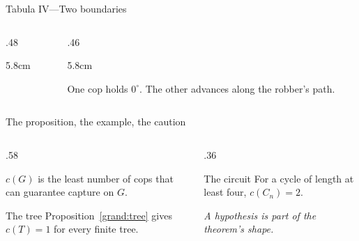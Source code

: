 \documentclass[aspectratio=169,11pt]{beamer}
\begin{document}
\begin{frame}{Tabula IV\enspace—\enspace Two boundaries}
  \begin{columns}[c,onlytextwidth]
    \begin{column}{.48\textwidth}
      \begin{overlayarea}{\linewidth}{5.8cm}
        \centering
      \end{overlayarea}
    \end{column}
    \begin{column}{.46\textwidth}
      \begin{overlayarea}{\linewidth}{5.8cm}
        \small\raggedright
        One cop holds $0^\circ$. The other advances along the robber's path.
        \par\smallskip
        \smallskip
      \end{overlayarea}
    \end{column}
  \end{columns}
\end{frame}

\begin{frame}{The proposition, the example, the caution}
  \begin{columns}[T,onlytextwidth]
    \begin{column}{.58\textwidth}
      \begin{definition}
        $c(G)$ is the least number of cops that can guarantee capture on $G$.
      \end{definition}
      \begin{exampleblock}{The tree}
        Proposition~\ref{grand:tree} gives $c(T)=1$ for every finite tree.
      \end{exampleblock}
    \end{column}
    \begin{column}{.36\textwidth}
      \begin{alertblock}{The circuit}
        For a cycle of length at least four, $c(C_n)=2$.
      \end{alertblock}
      \centering\medskip\AtlasGrandFleuron[21mm]\par\medskip
      {\small\itshape A hypothesis is part of the theorem's shape.}
    \end{column}
  \end{columns}
\end{frame}
\end{document}
